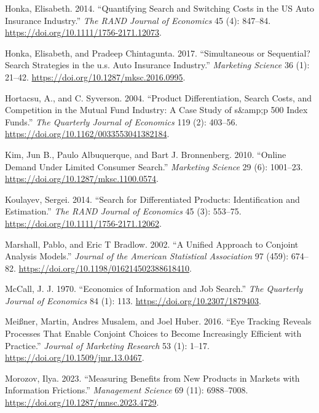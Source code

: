 \documentclass[
  letterpaper,
  DIV=11,
  numbers=noendperiod]{scrartcl}
\newlength{\cslhangindent}
\newenvironment{CSLReferences}[2] %
 {\begin{list}{}{%
  \setlength{\itemindent}{0pt}
  \setlength{\leftmargin}{0pt}
  \setlength{\parsep}{0pt}
  \ifodd #1
   \setlength{\leftmargin}{\cslhangindent}
   \setlength{\itemindent}{-1\cslhangindent}
  \fi
  \setlength{\itemsep}{#2\baselineskip}}}
 {\end{list}}
\begin{document}
\begin{CSLReferences}{1}{1}
Honka, Elisabeth. 2014. {``Quantifying Search and Switching Costs in the
{US} Auto Insurance Industry.''} \emph{The RAND Journal of Economics} 45
(4): 847--84. \url{https://doi.org/10.1111/1756-2171.12073}.

Honka, Elisabeth, and Pradeep Chintagunta. 2017. {``Simultaneous or
Sequential? Search Strategies in the u.s. Auto Insurance Industry.''}
\emph{Marketing Science} 36 (1): 21--42.
\url{https://doi.org/10.1287/mksc.2016.0995}.

Hortacsu, A., and C. Syverson. 2004. {``Product Differentiation, Search
Costs, and Competition in the Mutual Fund Industry: A Case Study of
s\&amp;p 500 Index Funds.''} \emph{The Quarterly Journal of Economics}
119 (2): 403--56. \url{https://doi.org/10.1162/0033553041382184}.

Kim, Jun B., Paulo Albuquerque, and Bart J. Bronnenberg. 2010. {``Online
Demand Under Limited Consumer Search.''} \emph{Marketing Science} 29
(6): 1001--23. \url{https://doi.org/10.1287/mksc.1100.0574}.

Koulayev, Sergei. 2014. {``Search for Differentiated Products:
Identification and Estimation.''} \emph{The RAND Journal of Economics}
45 (3): 553--75. \url{https://doi.org/10.1111/1756-2171.12062}.

Marshall, Pablo, and Eric T Bradlow. 2002. {``A Unified Approach to
Conjoint Analysis Models.''} \emph{Journal of the American Statistical
Association} 97 (459): 674--82.
\url{https://doi.org/10.1198/016214502388618410}.

McCall, J. J. 1970. {``Economics of Information and Job Search.''}
\emph{The Quarterly Journal of Economics} 84 (1): 113.
\url{https://doi.org/10.2307/1879403}.

Meißner, Martin, Andres Musalem, and Joel Huber. 2016. {``Eye Tracking
Reveals Processes That Enable Conjoint Choices to Become Increasingly
Efficient with Practice.''} \emph{Journal of Marketing Research} 53 (1):
1--17. \url{https://doi.org/10.1509/jmr.13.0467}.

Morozov, Ilya. 2023. {``Measuring Benefits from New Products in Markets
with Information Frictions.''} \emph{Management Science} 69 (11):
6988--7008. \url{https://doi.org/10.1287/mnsc.2023.4729}.


\end{CSLReferences}
\end{document}
